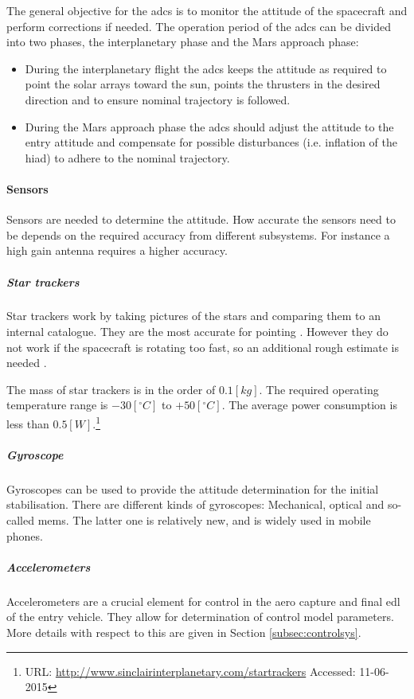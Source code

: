 The general objective for the \gls{adcs} is to monitor the attitude of the spacecraft and perform corrections if needed. The operation period of the \gls{adcs} can be divided into two phases, the interplanetary phase and the Mars approach phase:
\begin{itemize}
\item During the interplanetary flight the \gls{adcs} keeps the attitude as required to point the solar arrays toward the sun, points the thrusters in the desired direction and to ensure nominal trajectory is followed.

\item During the Mars approach phase the \gls{adcs} should adjust the attitude to the entry attitude and compensate for possible disturbances (i.e. inflation of the \gls{hiad}) to adhere to the nominal trajectory.
\end{itemize}
\paragraph{Sensors} Sensors are needed to determine the attitude. How accurate the sensors need to be depends on the required accuracy from different subsystems. For instance a high gain antenna requires a higher accuracy. 

\subparagraph{Star trackers}
Star trackers work by taking pictures of the stars and comparing them to an internal catalogue. They are the most accurate for pointing \cite{CarlChristianLiebe1995}. However they do not work if the spacecraft is rotating too fast, so an additional rough estimate is needed \cite[p. 584]{Wertz2011}. 

The mass of star trackers is in the order of $0.1 \left[kg\right]$. The required operating temperature range is $-30 \left[^\circ C\right]$ to $+50 \left[^\circ C\right]$. The average power consumption is less than $0.5 \left[W\right]$.\footnote{URL: \url{http://www.sinclairinterplanetary.com/startrackers} Accessed: 11-06-2015}

\subparagraph{Gyroscope}                        
Gyroscopes can be used to provide the attitude determination for the initial stabilisation. There are different kinds of gyroscopes: Mechanical, optical and so-called \gls{mems}. The latter one is relatively new, and is widely used in mobile phones. 

\subparagraph{Accelerometers}                        
Accelerometers are a crucial element for control in the aero capture and final \gls{edl} of the entry vehicle. They allow for determination of control model parameters. More details with respect to this are given in Section \ref{subsec:controlsys}.

